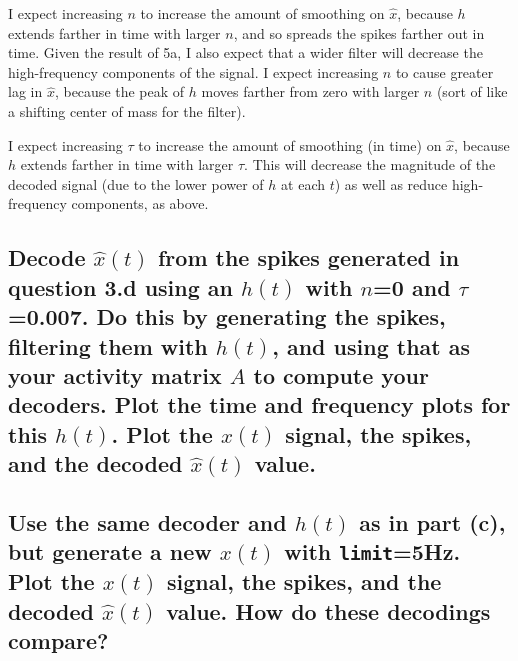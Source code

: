 \documentclass{article}
\begin{document}
    I expect increasing $n$ to increase the amount of smoothing on
$\hat{x}$, because $h$ extends farther in time with larger $n$, and so
spreads the spikes farther out in time. Given the result of 5a, I also
expect that a wider filter will decrease the high-frequency components
of the signal. I expect increasing $n$ to cause greater lag in
$\hat{x}$, because the peak of $h$ moves farther from zero with larger
$n$ (sort of like a shifting center of mass for the filter).

    I expect increasing $\tau$ to increase the amount of smoothing (in time)
on $\hat{x}$, because $h$ extends farther in time with larger $\tau$.
This will decrease the magnitude of the decoded signal (due to the lower
power of $h$ at each $t$) as well as reduce high-frequency components,
as above.

\subsection{Decode $\hat{x}(t)$ from the spikes generated in question
3.d using an $h(t)$ with $n$=0 and $\tau$=0.007. Do this by generating
the spikes, filtering them with $h(t)$, and using that as your activity
matrix $A$ to compute your decoders. Plot the time and frequency plots
for this $h(t)$. Plot the $x(t)$ signal, the spikes, and the decoded
$\hat{x}(t)$
value.}\label{c-decode-hatxt-from-the-spikes-generated-in-question-3.d-using-an-ht-with-n0-and-tau0.007.-do-this-by-generating-the-spikes-filtering-them-with-ht-and-using-that-as-your-activity-matrix-a-to-compute-your-decoders.-plot-the-time-and-frequency-plots-for-this-ht.-plot-the-xt-signal-the-spikes-and-the-decoded-hatxt-value.}

\subsection{Use the same decoder and $h(t)$ as in part (c), but
generate a new $x(t)$ with \texttt{limit}=5Hz. Plot the $x(t)$ signal,
the spikes, and the decoded $\hat{x}(t)$ value. How do these decodings
compare?}\label{d-use-the-same-decoder-and-ht-as-in-part-c-but-generate-a-new-xt-with-limit5hz.-plot-the-xt-signal-the-spikes-and-the-decoded-hatxt-value.-how-do-these-decodings-compare}
\end{document}
